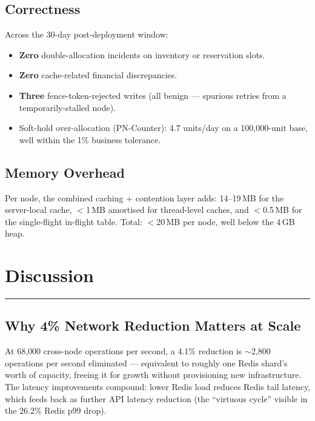 \documentclass[12pt,a4paper,oneside]{report}
\begin{document}
\section{Correctness}
Across the 30-day post-deployment window:
\begin{itemize}[leftmargin=*]
    \item \textbf{Zero} double-allocation incidents on inventory or reservation slots.
    \item \textbf{Zero} cache-related financial discrepancies.
    \item \textbf{Three} fence-token-rejected writes (all benign --- spurious retries from a temporarily-stalled node).
    \item Soft-hold over-allocation (PN-Counter): 4.7 units/day on a 100{,}000-unit base, well within the 1\% business tolerance.
\end{itemize}

\section{Memory Overhead}
Per node, the combined caching + contention layer adds: 14--19\,MB for the server-local cache, $<$1\,MB amortised for thread-level caches, and $<$0.5\,MB for the single-flight in-flight table. Total: $<$20\,MB per node, well below the 4\,GB heap.


\chapter{Discussion}
\label{chap:discussion}
\vspace{-1cm}
\noindent \rule{6.6in}{0.01in}

\section[Why 4\% Matters at Scale]{Why 4\% Network Reduction Matters at Scale}
At 68{,}000 cross-node operations per second, a 4.1\% reduction is $\sim$2{,}800 operations per second eliminated --- equivalent to roughly one Redis shard's worth of capacity, freeing it for growth without provisioning new infrastructure. The latency improvements compound: lower Redis load reduces Redis tail latency, which feeds back as further API latency reduction (the ``virtuous cycle'' visible in the 26.2\% Redis p99 drop).
\end{document}
